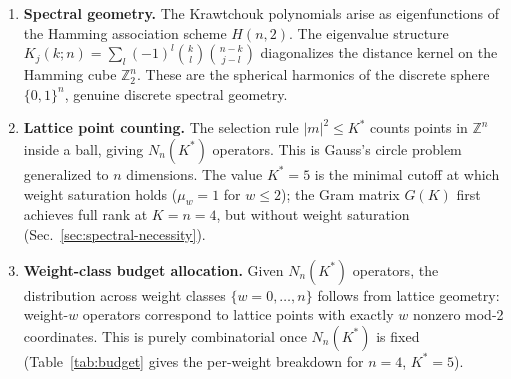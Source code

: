 \documentclass[twocolumn,prx,aps,superscriptaddress,longbibliography,floatfix]{revtex4-2}
\begin{document}
\begin{enumerate}
\item \textbf{Spectral geometry.}  The Krawtchouk polynomials arise
as eigenfunctions of the Hamming association scheme $H(n,2)$.  The
eigenvalue structure
$K_j(k;n) = \sum_l (-1)^l \binom{k}{l}\binom{n-k}{j-l}$
diagonalizes the distance kernel on the Hamming cube
$\mathbb{Z}_2^n$.  These are the spherical harmonics of the
discrete sphere $\{0,1\}^n$, genuine discrete spectral geometry.

\item \textbf{Lattice point counting.}  The selection rule
$|m|^2 \leq K^*$ counts points in $\mathbb{Z}^n$ inside a ball,
giving $N_n(K^*)$ operators.  This is Gauss's circle problem
generalized to $n$ dimensions.  The value $K^* = 5$ is the minimal cutoff at which
weight saturation holds ($\mu_w = 1$ for $w \le 2$);
the Gram matrix $G(K)$ first achieves full rank at
$K = n = 4$, but without weight saturation
(Sec.~\ref{sec:spectral-necessity}).

\item \textbf{Weight-class budget allocation.}  Given $N_n(K^*)$
operators, the distribution across weight classes
$\{w = 0, \ldots, n\}$ follows from lattice geometry: weight-$w$
operators correspond to lattice points with exactly $w$ nonzero
mod-2 coordinates.  This is purely combinatorial once $N_n(K^*)$ is
fixed (Table~\ref{tab:budget} gives the per-weight breakdown
for $n = 4$, $K^* = 5$).
\end{enumerate}
\end{document}

